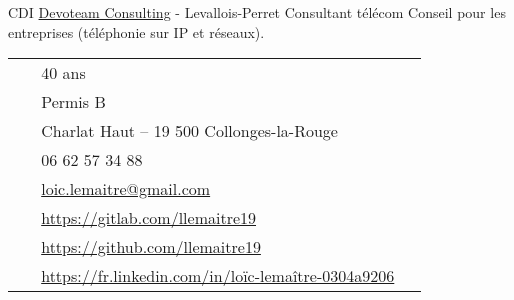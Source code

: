 \documentclass[10pt]{article} %
\begin{document}
\begin{paracol}{2}
  {CDI} %
  {\href{https://devoteam.com/}{Devoteam Consulting} {\small- Levallois-Perret}} %
  {Consultant télécom} %
  {Conseil pour les entreprises (téléphonie sur IP et réseaux).} %


  \vspace{-\baselineskip}\medskip %

  \switchcolumn%


  \parbox[top][0.12\textheight][c]{\linewidth}{ %
    \vspace{-0.04\textheight} %
    \colorbox{shade}{ %
      \begin{supertabular}{p{0.05\linewidth}|p{0.775\linewidth}} %
        \raisebox{0pt}{\faMale} & 40 ans \\ %
        \raisebox{-1pt}{\small\faCar} & Permis B \\ %
        \raisebox{-1pt}{\faHome} & Charlat Haut -- 19 500 Collonges-la-Rouge \\ %
        \raisebox{-1pt}{\faPhone} & 06 62 57 34 88 \\ %
        \raisebox{0pt}{\small\faEnvelope} & \href{mailto:loic.lemaitre@gmail.com}{loic.lemaitre@gmail.com} \\ %
        \raisebox{-1pt}{\small\faGitlab} & \href{https://gitlab.com/llemaitre19}{https://gitlab.com/llemaitre19} \\ %
        \raisebox{-1pt}{\small\faGithub} & \href{https://github.com/llemaitre19}{https://github.com/llemaitre19} \\ %
        \raisebox{-1pt}{\small\faLinkedin} & \href{https://fr.linkedin.com/in/lo\%C3\%AFc-lema\%C3\%AEtre-0304a9206}{https://fr.linkedin.com/in/loïc-lemaître-0304a9206} \\ %
      \end{supertabular}
    }
  }


\end{paracol}
\end{document}
